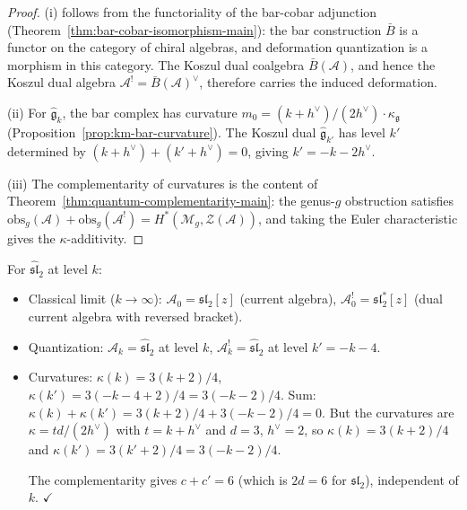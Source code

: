 \begin{proof}
(i) follows from the functoriality of the bar-cobar adjunction
(Theorem~\ref{thm:bar-cobar-isomorphism-main}): the bar construction
$\bar{B}$ is a functor on the category of chiral algebras, and
deformation quantization is a morphism in this category.  The
Koszul dual coalgebra $\bar{B}(\mathcal{A})$, and hence the Koszul
dual algebra $\mathcal{A}^! = \bar{B}(\mathcal{A})^\vee$, therefore
carries the induced deformation.

(ii) For $\widehat{\mathfrak{g}}_k$, the bar complex has curvature
$m_0 = (k + h^\vee)/(2h^\vee) \cdot \kappa_{\mathfrak{g}}$
(Proposition~\ref{prop:km-bar-curvature}).  The Koszul dual
$\widehat{\mathfrak{g}}_{k'}$ has level $k'$ determined by
$(k + h^\vee) + (k' + h^\vee) = 0$, giving $k' = -k - 2h^\vee$.

(iii) The complementarity of curvatures is the content of
Theorem~\ref{thm:quantum-complementarity-main}:
the genus-$g$ obstruction satisfies
$\mathrm{obs}_g(\mathcal{A}) + \mathrm{obs}_g(\mathcal{A}^!)
= H^*(\mathcal{M}_g, \mathcal{Z}(\mathcal{A}))$,
and taking the Euler characteristic gives the $\kappa$-additivity.
\end{proof}

\begin{computation}
\label{comp:dq-koszul-km}

For $\widehat{\mathfrak{sl}}_2$ at level $k$:
\begin{itemize}
\item Classical limit ($k \to \infty$):
$\mathcal{A}_0 = \mathfrak{sl}_2[z]$ (current algebra),
$\mathcal{A}_0^! = \mathfrak{sl}_2^*[z]$
(dual current algebra with reversed bracket).
\item Quantization: $\mathcal{A}_k = \widehat{\mathfrak{sl}}_2$ at
level $k$, $\mathcal{A}_k^! = \widehat{\mathfrak{sl}}_2$ at
level $k' = -k-4$.
\item Curvatures: $\kappa(k) = 3(k+2)/4$, $\kappa(k') = 3(-k-4+2)/4 = 3(-k-2)/4$.
Sum: $\kappa(k) + \kappa(k') = 3(k+2)/4 + 3(-k-2)/4 = 0$.
But the curvatures are $\kappa = td/(2h^\vee)$ with $t = k + h^\vee$
and $d = 3$, $h^\vee = 2$, so $\kappa(k) = 3(k+2)/4$ and
$\kappa(k') = 3(k'+2)/4 = 3(-k-2)/4$.

The complementarity gives $c + c' = 6$ (which is $2d = 6$ for
$\mathfrak{sl}_2$), independent of $k$.  $\checkmark$
\end{itemize}
\end{computation}

